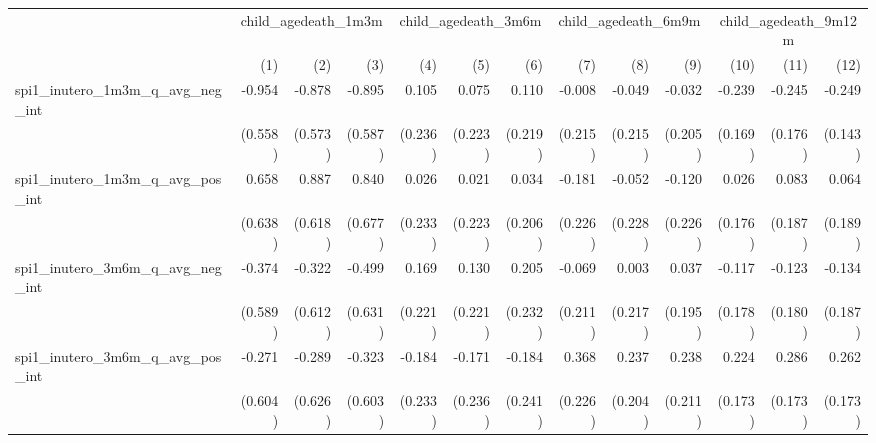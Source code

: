 \begin{tabular}{lrrrrrrrrrrrr}
\toprule
                                            &  \multicolumn{3}{c}{child\_agedeath\_1m3m} &  \multicolumn{3}{c}{child\_agedeath\_3m6m} &  \multicolumn{3}{c}{child\_agedeath\_6m9m} & \multicolumn{3}{c}{child\_agedeath\_9m12m} \\ 
\cmidrule(lr){2-4} \cmidrule(lr){5-7} \cmidrule(lr){8-10} \cmidrule(lr){11-13} 
                                            &          (1) &          (2) &          (3) &          (4) &          (5) &          (6) &          (7) &          (8) &          (9) &         (10) &         (11) &         (12) \\ 
\midrule
spi1\_inutero\_1m3m\_q\_avg\_neg\_int       &       -0.954 &       -0.878 &       -0.895 &        0.105 &        0.075 &        0.110 &       -0.008 &       -0.049 &       -0.032 &       -0.239 &       -0.245 &       -0.249 \\ 
                                            &      (0.558) &      (0.573) &      (0.587) &      (0.236) &      (0.223) &      (0.219) &      (0.215) &      (0.215) &      (0.205) &      (0.169) &      (0.176) &      (0.143) \\ 
spi1\_inutero\_1m3m\_q\_avg\_pos\_int       &        0.658 &        0.887 &        0.840 &        0.026 &        0.021 &        0.034 &       -0.181 &       -0.052 &       -0.120 &        0.026 &        0.083 &        0.064 \\ 
                                            &      (0.638) &      (0.618) &      (0.677) &      (0.233) &      (0.223) &      (0.206) &      (0.226) &      (0.228) &      (0.226) &      (0.176) &      (0.187) &      (0.189) \\ 
spi1\_inutero\_3m6m\_q\_avg\_neg\_int       &       -0.374 &       -0.322 &       -0.499 &        0.169 &        0.130 &        0.205 &       -0.069 &        0.003 &        0.037 &       -0.117 &       -0.123 &       -0.134 \\ 
                                            &      (0.589) &      (0.612) &      (0.631) &      (0.221) &      (0.221) &      (0.232) &      (0.211) &      (0.217) &      (0.195) &      (0.178) &      (0.180) &      (0.187) \\ 
spi1\_inutero\_3m6m\_q\_avg\_pos\_int       &       -0.271 &       -0.289 &       -0.323 &       -0.184 &       -0.171 &       -0.184 &        0.368 &        0.237 &        0.238 &        0.224 &        0.286 &        0.262 \\ 
                                            &      (0.604) &      (0.626) &      (0.603) &      (0.233) &      (0.236) &      (0.241) &      (0.226) &      (0.204) &      (0.211) &      (0.173) &      (0.173) &      (0.173) \\ 

\end{tabular}

